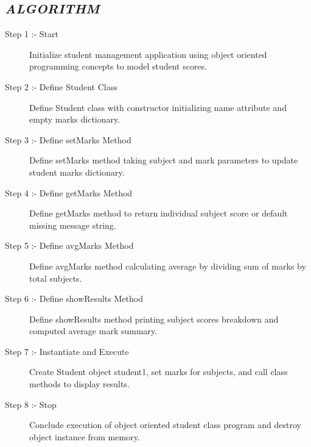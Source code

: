 \documentclass[11pt,a4paper]{article}
\begin{document}
\subsection*{\textit{ALGORITHM}}
\begin{description}
  \item[Step 1 :- Start] Initialize student management application using object oriented programming concepts to model student scores.
  \item[Step 2 :- Define Student Class] Define Student class with constructor initializing name attribute and empty marks dictionary.
  \item[Step 3 :- Define setMarks Method] Define setMarks method taking subject and mark parameters to update student marks dictionary.
  \item[Step 4 :- Define getMarks Method] Define getMarks method to return individual subject score or default missing message string.
  \item[Step 5 :- Define avgMarks Method] Define avgMarks method calculating average by dividing sum of marks by total subjects.
  \item[Step 6 :- Define showResults Method] Define showResults method printing subject scores breakdown and computed average mark summary.
  \item[Step 7 :- Instantiate and Execute] Create Student object student1, set marks for subjects, and call class methods to display results.
  \item[Step 8 :- Stop] Conclude execution of object oriented student class program and destroy object instance from memory.
\end{description}
\end{document}
